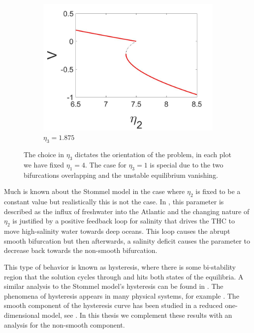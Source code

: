\begin{figure}[H]
\begin{subfigure}{.5\textwidth}
 \includegraphics[width=\linewidth]{intro/V_bif_reverse.jpg}
 \caption{$\eta_3=1.875$}
\end{subfigure}
\caption{The choice in $\eta_3$ dictates the orientation of the problem, in each plot we have fixed $\eta_1=4$. The case for $\eta_3=1$ is special due to the two bifurcations overlapping and the unstable equilibrium vanishing.}
\label{fig:Stommel_bif_plots}
\end{figure}

Much is known about the Stommel model in the case where $\eta_2$ is fixed to be a constant value but realistically this is not the case. In \cite{rahmstorf2000thermohaline}, this parameter is described as the influx of freshwater into the Atlantic and the changing nature of $\eta_2$ is justified by a positive feedback loop for salinity that drives the THC to move high-salinity water towards deep oceans. This loop causes the abrupt smooth bifurcation but then afterwards, a salinity deficit causes the parameter to decrease back towards the non-smooth bifurcation.

This type of behavior is known as hysteresis, where there is some bi-stability region that the solution cycles through and hits both states of the equilibria. A similar analysis to the Stommel model's hysteresis can be found in \cite{roberts2017relaxation}. The phenomena of hysteresis appears in many physical systems, for example \cite{jung1990scaling,hohl1995scaling,joshi2005dynamical}. The smooth component of the hysteresis curve has been studied in a reduced one-dimensional model, see \cite{zhu2015tipping}. In this thesis we complement these results with an analysis for the non-smooth component.

